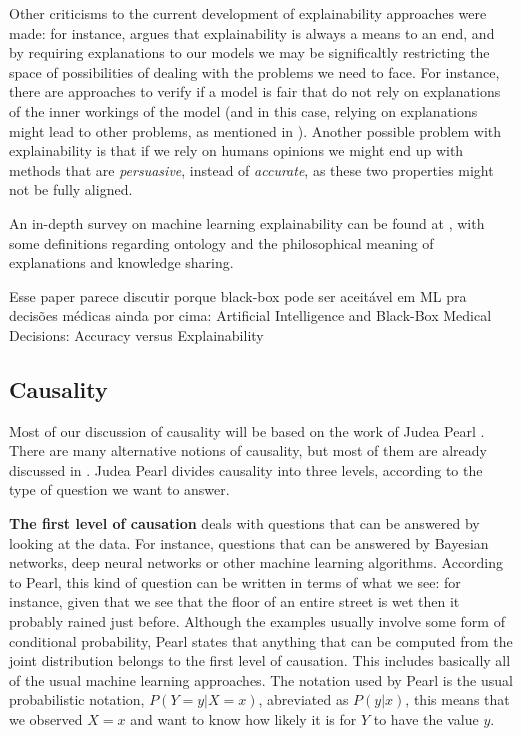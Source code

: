 Other criticisms to the current development of explainability approaches were made: for instance, \cite{krishnan2020against} argues that explainability is always a means to an end, and by requiring explanations to our models we may be significaltly restricting the space of possibilities of dealing with the problems we need to face. For instance, there are approaches to verify if a model is fair that do not rely on explanations of the inner workings of the model (and in this case, relying on explanations might lead to other problems, as mentioned in \cite{ExplainAll}). Another possible problem with explainability is that if we rely on humans opinions we might end up with methods that are \emph{persuasive}, instead of \emph{accurate}, as these two properties might not be fully aligned. 

An in-depth survey on machine learning explainability can be found at \cite{burkart2021survey}, with some definitions regarding ontology and the philosophical meaning of explanations and knowledge sharing. 

{\color{red} Esse paper parece discutir porque black-box pode ser aceitável em ML pra decisões médicas ainda por cima: Artificial Intelligence and Black-Box Medical Decisions: Accuracy versus Explainability}

\subsection{Causality}

Most of our discussion of causality will be based on the work of Judea Pearl \cite{Causality}. There are many alternative notions of causality, but most of them are already discussed in \cite{Causality}. Judea Pearl divides causality into three levels, according to the type of question we want to answer. 

\textbf{The first level of causation} deals with questions that can be answered by looking at the data. For instance, questions that can be answered by Bayesian networks, deep neural networks or other machine learning algorithms. According to Pearl, this kind of question can be written in terms of what we see: for instance, given that we see that the floor of an entire street is wet then it probably rained just before. Although the examples usually involve some form of conditional probability, Pearl states that anything that can be computed from the joint distribution belongs to the first level of causation. This includes basically all of the usual machine learning approaches. The notation used by Pearl is the usual probabilistic notation, $P(Y=y|X=x)$, abreviated as $P(y|x)$, this means that we observed $X=x$ and want to know how likely it is for $Y$ to have the value $y$.

